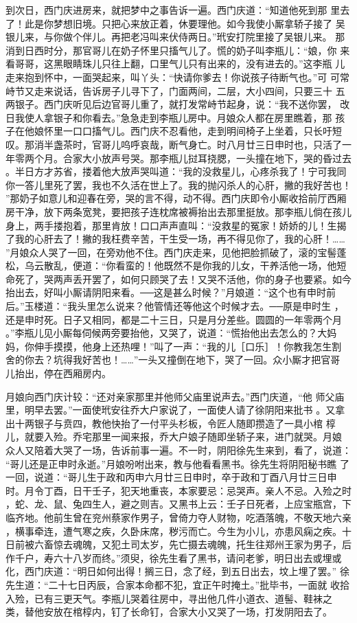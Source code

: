 到次日，西门庆进房来，就把梦中之事告诉一遍。西门庆道：“知道他死到那
里去了！此是你梦想旧境。只把心来放正着，休要理他。如今我使小厮拿轿子接了
吴银儿来，与你做个伴儿。再把老冯叫来伏侍两日。”玳安打院里接了吴银儿来。
那消到日西时分，那官哥儿在奶子怀里只搐气儿了。慌的奶子叫李瓶儿：“娘，你
来看哥哥，这黑眼睛珠儿只往上翻，口里气儿只有出来的，没有进去的。”这李瓶
儿走来抱到怀中，一面哭起来，叫丫头：“快请你爹去！你说孩子待断气也。”可
可常峙节又走来说话，告诉房子儿寻下了，门面两间，二层，大小四间，只要三十
五两银子。西门庆听见后边官哥儿重了，就打发常峙节起身，说：“我不送你罢，
改日我使人拿银子和你看去。”急急走到李瓶儿房中。月娘众人都在房里瞧着，那
孩子在他娘怀里一口口搐气儿。西门庆不忍看他，走到明间椅子上坐着，只长吁短
叹。那消半盏茶时，官哥儿呜呼哀哉，断气身亡。时八月廿三日申时也，只活了一
年零两个月。合家大小放声号哭。那李瓶儿挝耳挠腮，一头撞在地下，哭的昏过去
。半日方才苏省，搂着他大放声哭叫道：“我的没救星儿，心疼杀我了！宁可我同
你一答儿里死了罢，我也不久活在世上了。我的抛闪杀人的心肝，撇的我好苦也！
”那奶子如意儿和迎春在旁，哭的言不得，动不得。西门庆即令小厮收拾前厅西厢
房干净，放下两条宽凳，要把孩子连枕席被褥抬出去那里挺放。那李瓶儿倘在孩儿
身上，两手搂抱着，那里肯放！口口声声直叫：“没救星的冤家！娇娇的儿！生揭
了我的心肝去了！撇的我枉费辛苦，干生受一场，再不得见你了，我的心肝！……
”月娘众人哭了一回，在旁劝他不住。西门庆走来，见他把脸抓破了，滚的宝髻蓬
松，乌云散乱，便道：“你看蛮的！他既然不是你我的儿女，干养活他一场，他短
命死了，哭两声丢开罢了，如何只顾哭了去！又哭不活他，你的身子也要紧。如今
抬出去，好叫小厮请阴阳来看。──这是甚么时候？”月娘道：“这个也有申时前
后。”玉楼道：“我头里怎么说来？他管情还等他这个时候才去。──原是申时生
，还是申时死。日子又相同，都是二十三日，只是月分差些。圆圆的一年零两个月
。”李瓶儿见小厮每伺候两旁要抬他，又哭了，说道：“慌抬他出去怎么的？大妈
妈，你伸手摸摸，他身上还热哩！”叫了一声：“我的儿［口乐］！你教我怎生割
舍的你去？坑得我好苦也！……”一头又撞倒在地下，哭了一回。众小厮才把官哥
儿抬出，停在西厢房内。

月娘向西门庆计较：“还对亲家那里并他师父庙里说声去。”西门庆道，“他
师父庙里，明早去罢。”一面使玳安往乔大户家说了，一面使人请了徐阴阳来批书
。又拿出十两银子与贲四，教他快抬了一付平头杉板，令匠人随即攒造了一具小棺
椁儿，就要入殓。乔宅那里一闻来报，乔大户娘子随即坐轿子来，进门就哭。月娘
众人又陪着大哭了一场，告诉前事一遍。不一时，阴阳徐先生来到，看了，说道：
“哥儿还是正申时永逝。”月娘吩咐出来，教与他看看黑书。徐先生将阴阳秘书瞧
了一回，说道：“哥儿生于政和丙申六月廿三日申时，卒于政和丁酉八月廿三日申
时。月令丁酉，日干壬子，犯天地重丧，本家要忌：忌哭声。亲人不忌。入殓之时
，蛇、龙、鼠、兔四生人，避之则吉。又黑书上云：壬子日死者，上应宝瓶宫，下
临齐地。他前生曾在兖州蔡家作男子，曾倚力夺人财物，吃酒落魄，不敬天地六亲
，横事牵连，遭气寒之疾，久卧床席，秽污而亡。今生为小儿，亦患风痫之疾。十
日前被六畜惊去魂魄，又犯土司太岁，先亡摄去魂魄，托生往郑州王家为男子，后
作千户，寿六十八岁而终。”须臾，徐先生看了黑书，请问老爹，明日出去或埋或
化，西门庆道：“明日如何出得！搁三日，念了经，到五日出去，坟上埋了罢。”
徐先生道：“二十七日丙辰，合家本命都不犯，宜正午时掩土。”批毕书，一面就
收拾入殓，已有三更天气。李瓶儿哭着往房中，寻出他几件小道衣、道髻、鞋袜之
类，替他安放在棺椁内，钉了长命钉，合家大小又哭了一场，打发阴阳去了。

